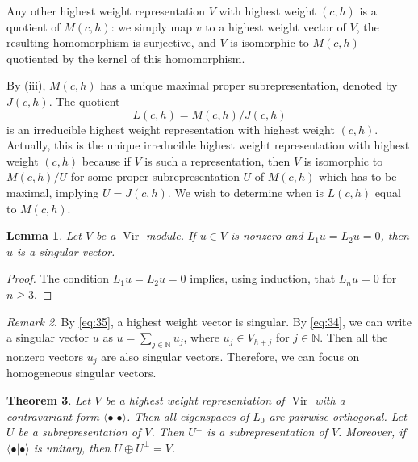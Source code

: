 \documentclass[a4paper, 12pt, reqno]{amsart}
\newtheorem{theorem}{Theorem}[section]
\newtheorem{lemma}[theorem]{Lemma}
\theoremstyle{remark}
\newtheorem{remark}[theorem]{Remark}
\DeclareMathOperator{\Vir}{Vir}
\begin{document}
Any other highest weight representation $V$ with highest weight $(c, h)$ is a quotient of $M(c, h)$: we simply map $v$ to a highest weight vector of $V$, the resulting homomorphism is surjective, and $V$ is isomorphic to $M(c, h)$ quotiented by the kernel of this homomorphism.

By (iii), $M(c, h)$ has a unique maximal proper subrepresentation, denoted by $J(c, h)$.
The quotient
\begin{equation*}
  L(c, h) = M(c, h)/J(c, h)
\end{equation*}
is an irreducible highest weight representation with highest weight $(c, h)$.
Actually, this is the unique irreducible highest weight representation with highest weight $(c, h)$ because if $V$ is such a representation, then $V$ is isomorphic to $M(c, h)/U$ for some proper subrepresentation $U$ of $M(c, h)$ which has to be maximal, implying $U = J(c, h)$.
We wish to determine when is $L(c, h)$ equal to $M(c, h)$.

\begin{lemma}
  \label{lmm:19}
  Let $V$ be a $\Vir$-module.
  If $u \in V$ is nonzero and $L_1u = L_2u = 0$, then $u$ is a singular vector.
\end{lemma}

\begin{proof}
  The condition $L_1u = L_2u = 0$ implies, using induction, that $L_nu = 0$ for $n \ge 3$.
\end{proof}

\begin{remark}
  \label{rmk:28}
  By \eqref{eq:35}, a highest weight vector is singular.
  By \eqref{eq:34}, we can write a singular vector $u$ as $u = \sum_{j \in \mathbb{N}}u_j$, where $u_j \in V_{h + j}$ for $j \in \mathbb{N}$.
  Then all the nonzero vectors $u_j$ are also singular vectors.
  Therefore, we can focus on homogeneous singular vectors.
\end{remark}

\begin{theorem}
  \label{thr:29}
  Let $V$ be a highest weight representation of $\Vir$ with a contravariant form $\langle\bullet| \bullet\rangle$.
  Then all eigenspaces of $L_0$ are pairwise orthogonal.
  Let $U$ be a subrepresentation of $V$.
  Then $U^{\perp}$ is a subrepresentation of $V$.
  Moreover, if $\langle\bullet| \bullet\rangle$ is unitary, then $U \oplus U^{\perp} = V$.
\end{theorem}
\end{document}
